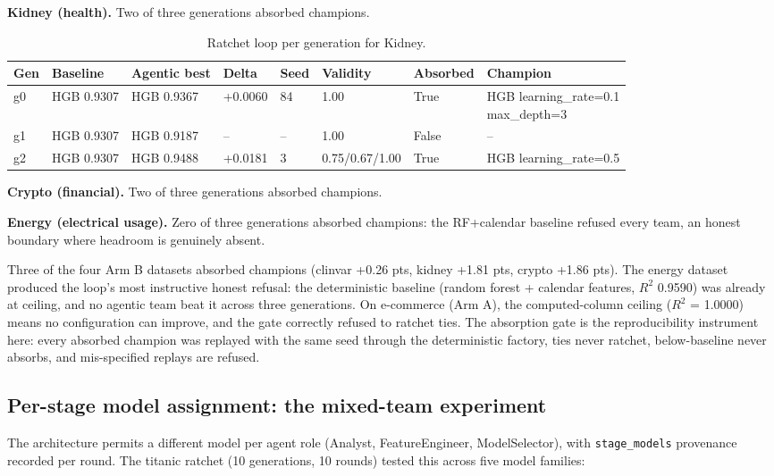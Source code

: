 \textbf{Kidney (health).} Two of three generations absorbed champions.
\begin{table}[H]
\centering\small
\caption{Ratchet loop per generation for Kidney.}
\label{tab:ratchet-generations-ratchet-ledger-kidney}
\begin{tabular}{llllllll}
\toprule
Gen & Baseline & Agentic best & Delta & Seed & Validity & Absorbed & Champion \\
\midrule
g0 & HGB 0.9307 & HGB 0.9367 & +0.0060 & 84 & 1.00 & True & \makecell[l]{HGB learning\_rate=0.1\\max\_depth=3} \\
g1 & HGB 0.9307 & HGB 0.9187 & -- & -- & 1.00 & False & -- \\
g2 & HGB 0.9307 & HGB 0.9488 & +0.0181 & 3 & 0.75/0.67/1.00 & True & HGB learning\_rate=0.5 \\
\bottomrule
\end{tabular}
\end{table}


\textbf{Crypto (financial).} Two of three generations absorbed champions.


\textbf{Energy (electrical usage).} Zero of three generations absorbed
champions: the RF+calendar baseline refused every team, an honest boundary
where headroom is genuinely absent.


Three of the four Arm B datasets absorbed champions (clinvar +0.26 pts,
kidney +1.81 pts, crypto +1.86 pts). The energy dataset produced the loop's
most instructive honest refusal: the deterministic baseline (random forest +
calendar features, $R^2$ 0.9590) was already at ceiling, and no agentic team
beat it across three generations. On e-commerce (Arm A), the computed-column
ceiling ($R^2$ = 1.0000) means no configuration can improve, and the gate
correctly refused to ratchet ties. The absorption gate is the
reproducibility instrument here: every absorbed champion was replayed with
the same seed through the deterministic factory, ties never ratchet,
below-baseline never absorbs, and mis-specified replays are refused.

\subsection{Per-stage model assignment: the mixed-team experiment}
\label{sec:mixedteam}

The architecture permits a different model per agent role (Analyst, FeatureEngineer, ModelSelector), with \texttt{stage\_models} provenance recorded per round. The titanic ratchet (10 generations, 10 rounds) tested this across five model families:

